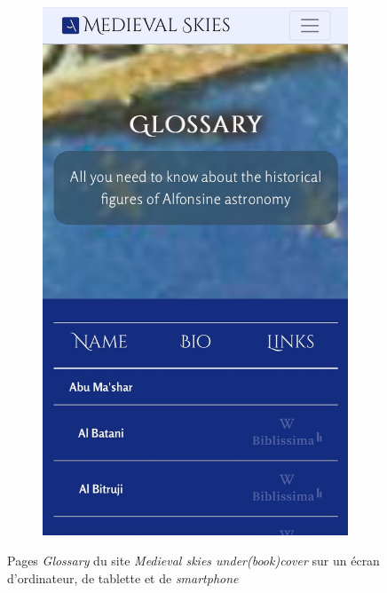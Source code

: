 \begin{figure}[!h]
\begin{subfigure}[h]{0.3\textwidth}
        \includegraphics[width=\textwidth]{images/annexes/glossary-smartphone.jpeg}
    \end{subfigure}
    
    \caption{Pages \textit{Glossary} du site \textit{Medieval skies under(book)cover} sur un écran d'ordinateur, de tablette et de \textit{smartphone}}
    \end{figure}